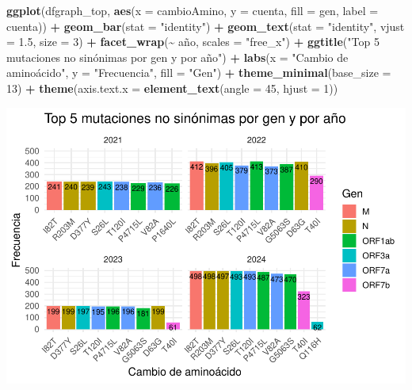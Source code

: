 \documentclass[
]{article}
\newenvironment{Shaded}{\begin{snugshade}}{\end{snugshade}}
\newcommand{\AttributeTok}[1]{\textcolor[rgb]{0.13,0.29,0.53}{#1}}
\newcommand{\DecValTok}[1]{\textcolor[rgb]{0.00,0.00,0.81}{#1}}
\newcommand{\FloatTok}[1]{\textcolor[rgb]{0.00,0.00,0.81}{#1}}
\newcommand{\FunctionTok}[1]{\textcolor[rgb]{0.13,0.29,0.53}{\textbf{#1}}}
\newcommand{\NormalTok}[1]{#1}
\newcommand{\SpecialCharTok}[1]{\textcolor[rgb]{0.81,0.36,0.00}{\textbf{#1}}}
\newcommand{\StringTok}[1]{\textcolor[rgb]{0.31,0.60,0.02}{#1}}
\begin{document}
\begin{Shaded}
\begin{Highlighting}[]
\FunctionTok{ggplot}\NormalTok{(dfgraph\_top, }\FunctionTok{aes}\NormalTok{(}\AttributeTok{x =}\NormalTok{ cambioAmino, }\AttributeTok{y =}\NormalTok{ cuenta, }\AttributeTok{fill =}\NormalTok{ gen, }\AttributeTok{label =}\NormalTok{ cuenta)) }\SpecialCharTok{+}
  \FunctionTok{geom\_bar}\NormalTok{(}\AttributeTok{stat =} \StringTok{"identity"}\NormalTok{) }\SpecialCharTok{+}
  \FunctionTok{geom\_text}\NormalTok{(}\AttributeTok{stat =} \StringTok{"identity"}\NormalTok{, }\AttributeTok{vjust =} \FloatTok{1.5}\NormalTok{, }\AttributeTok{size =} \DecValTok{3}\NormalTok{) }\SpecialCharTok{+}
  \FunctionTok{facet\_wrap}\NormalTok{(}\SpecialCharTok{\textasciitilde{}}\NormalTok{ año, }\AttributeTok{scales =} \StringTok{"free\_x"}\NormalTok{) }\SpecialCharTok{+}
  \FunctionTok{ggtitle}\NormalTok{(}\StringTok{"Top 5 mutaciones no sinónimas por gen y por año"}\NormalTok{) }\SpecialCharTok{+}
  \FunctionTok{labs}\NormalTok{(}\AttributeTok{x =} \StringTok{"Cambio de aminoácido"}\NormalTok{, }\AttributeTok{y =} \StringTok{"Frecuencia"}\NormalTok{, }\AttributeTok{fill =} \StringTok{"Gen"}\NormalTok{) }\SpecialCharTok{+}
  \FunctionTok{theme\_minimal}\NormalTok{(}\AttributeTok{base\_size =} \DecValTok{13}\NormalTok{) }\SpecialCharTok{+}
  \FunctionTok{theme}\NormalTok{(}\AttributeTok{axis.text.x =} \FunctionTok{element\_text}\NormalTok{(}\AttributeTok{angle =} \DecValTok{45}\NormalTok{, }\AttributeTok{hjust =} \DecValTok{1}\NormalTok{))}
\end{Highlighting}
\end{Shaded}

\includegraphics{situacion_problema_files/figure-latex/unnamed-chunk-3-1.pdf}
\end{document}

